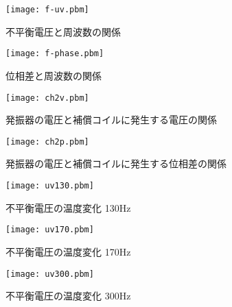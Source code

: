 \begin{figure}[htb]
		\begin{center}
		\texttt{[image: f-uv.pbm]} 
		\end{center}
	\caption{不平衡電圧と周波数の関係}
	\label{fig:f-Unbalanced}
\end{figure}

\begin{figure}[htb]
	\begin{center}
	\texttt{[image: f-phase.pbm]}
	\end{center}
	\caption{位相差と周波数の関係}
	\label{fig:p-Unbalanced}
\end{figure}

\begin{figure}[htb]
	\begin{center}
	\texttt{[image: ch2v.pbm]}
	\end{center}
	\caption{発振器の電圧と補償コイルに発生する電圧の関係}
	\label{fig:ch2v}
\end{figure}

\begin{figure}[htb]
	\begin{center}
	\texttt{[image: ch2p.pbm]}
	\end{center}
	\caption{発振器の電圧と補償コイルに発生する位相差の関係}
	\label{fig:ch2p}
\end{figure}

\begin{figure}[htb]
	\begin{center}
	\texttt{[image: uv130.pbm]}
	\end{center}
	\caption{不平衡電圧の温度変化 130Hz}
	\label{fig:U.Voltage 130Hz}
\end{figure}

\begin{figure}[htb]
	\begin{center}
	\texttt{[image: uv170.pbm]}
	\end{center}
	\caption{不平衡電圧の温度変化 170Hz}
	\label{fig:U.Voltage 170Hz}
\end{figure}

\begin{figure}[htb]
	\begin{center}
	\texttt{[image: uv300.pbm]}
	\end{center}
	\caption{不平衡電圧の温度変化 300Hz}
	\label{fig:U.Voltage 300Hz}
\end{figure}

